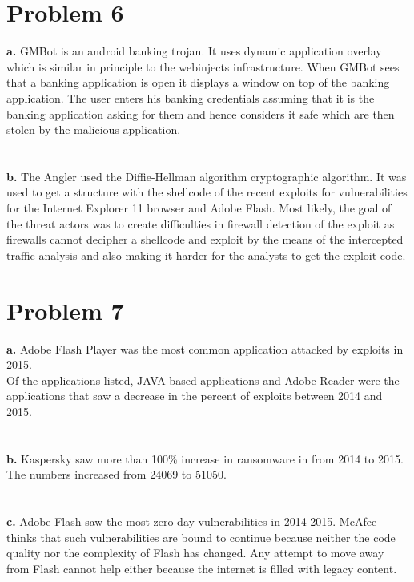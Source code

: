\documentclass[10pt]{article}
\begin{document}
\section{Problem 6}
\textbf{a.} GMBot is an android banking trojan. It uses dynamic application overlay which is similar in principle to the webinjects infrastructure. When GMBot sees that a banking application is open it displays a window on top of the banking application. The user enters his banking credentials assuming that it is the banking application asking for them and hence considers it safe which are then stolen by the malicious application.\\\\\\
\textbf{b.} The Angler used the Diffie-Hellman algorithm cryptographic algorithm. It was used  to get a structure with the shellcode of the recent exploits for vulnerabilities for the Internet Explorer 11 browser and Adobe Flash. Most likely, the goal of the threat actors was to create difficulties in firewall detection of the exploit as firewalls cannot decipher a shellcode and exploit by the means of the intercepted traffic analysis and also making it harder for the analysts to get the exploit code.
\section{Problem 7}
\textbf{a.} Adobe Flash Player was the most common application attacked by exploits in 2015.\\
Of the applications listed, JAVA based applications and Adobe Reader were the applications that saw a decrease in the percent of exploits between 2014 and 2015.\\\\\\
\textbf{b.} Kaspersky saw more than 100\% increase in ransomware in from 2014 to 2015. The numbers increased from 24069 to 51050.\\\\\\
\textbf{c.} Adobe Flash saw the most zero-day vulnerabilities in 2014-2015. McAfee thinks that such vulnerabilities are bound to continue because neither the code quality nor the complexity of Flash has changed. Any attempt to move away from Flash cannot help either because the internet is filled with legacy content.
\end{document}
